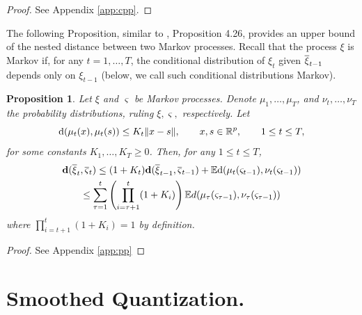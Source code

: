 \documentclass{article}              %
\newtheorem{proposition}{Proposition}
\begin{document}
\begin{proof} See Appendix \ref{app:cpp}.
\end{proof}


\noindent The following Proposition, similar to \cite{pflug2014multistage},
Proposition 4.26, provides an upper bound of the nested distance between
two Markov processes. Recall that the process $\xi$ is Markov if, for any $t=1,\dots,T$, the conditional distribution of $\xi_t$ given $\overline{\xi}_{t-1}$ depends only on $\xi_{t-1}$ (below, we call such conditional distributions Markov). 
\begin{proposition}
\label{prop:pp} Let $\xi$ and $\varsigma$ be Markov processes. Denote $\mu_{1},\dots,\mu_{T}$,
and $\nu_{t},\dots,\nu_{T}$ the probability distributions, ruling $\xi,\varsigma,$
respectively.
Let
\begin{equation}
\mathrm{d}(\mu_{t}(x),\mu_{t}(s))\leq K_{t}\|x-s\|,\qquad x,s\in\mathbb{R}^{p},\qquad1\leq t\leq T,\label{eq:ktl}
\end{equation}
for some constants $K_{1},\dots,K_{T}\geq 0$. Then, for any $1\leq t\leq T$,
\begin{multline}
\mathbf{d}(\overline{\xi}_{t},\overline{\varsigma}_{t})\leq(1+K_{t})\mathbf{d}(\overline{\xi}_{t-1},\overline{\varsigma}_{t-1})+\mathbb{E}\mathrm{d}(\mu_{t}(\varsigma_{t-1}),\nu_{t}(\varsigma_{t-1}))\\
\leq\sum_{\tau=1}^{t}\left(\prod_{i=\tau+1}^{t}(1+K_{i})\right)\mathbb{E} d(\mu_{\tau}(\varsigma_{\text{\ensuremath{\tau}}-1}),\nu_{\tau}(\varsigma_{\tau-1}))\label{eq:df}
\end{multline}
where $\prod_{i=t+1}^{t}(1+K_{i}) = 1$ by definition.
\end{proposition}

\begin{proof} See Appendix \ref{app:pp}
\end{proof}

\section{\label{sec:sq}Smoothed Quantization.}
\end{document}
